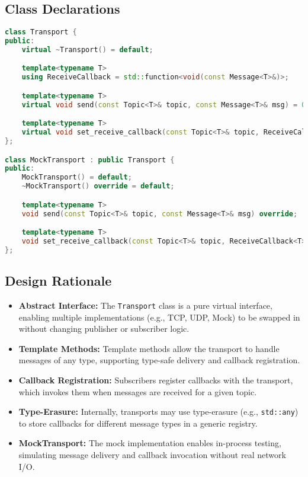 \documentclass[12pt]{report}
\begin{document}
\subsection{Class Declarations}
\begin{lstlisting}[language=C++]
class Transport {
public:
    virtual ~Transport() = default;

    template<typename T>
    using ReceiveCallback = std::function<void(const Message<T>&)>;

    template<typename T>
    virtual void send(const Topic<T>& topic, const Message<T>& msg) = 0;

    template<typename T>
    virtual void set_receive_callback(const Topic<T>& topic, ReceiveCallback<T> cb) = 0;
};

class MockTransport : public Transport {
public:
    MockTransport() = default;
    ~MockTransport() override = default;

    template<typename T>
    void send(const Topic<T>& topic, const Message<T>& msg) override;

    template<typename T>
    void set_receive_callback(const Topic<T>& topic, ReceiveCallback<T> cb) override;
};
\end{lstlisting}

\subsection{Design Rationale}
\begin{itemize}
    \item \textbf{Abstract Interface:} The \texttt{Transport} class is a pure virtual interface, enabling multiple implementations (e.g., TCP, UDP, Mock) to be swapped in without changing publisher or subscriber logic.
    \item \textbf{Template Methods:} Template methods allow the transport to handle messages of any type, supporting type-safe delivery and callback registration.
    \item \textbf{Callback Registration:} Subscribers register callbacks with the transport, which invokes them when messages are received for a given topic.
    \item \textbf{Type-Erasure:} Internally, transports may use type-erasure (e.g., \texttt{std::any}) to store callbacks for different message types in a generic registry.
    \item \textbf{MockTransport:} The mock implementation enables in-process testing, simulating message delivery and callback invocation without real network I/O.
\end{itemize}
\end{document}
